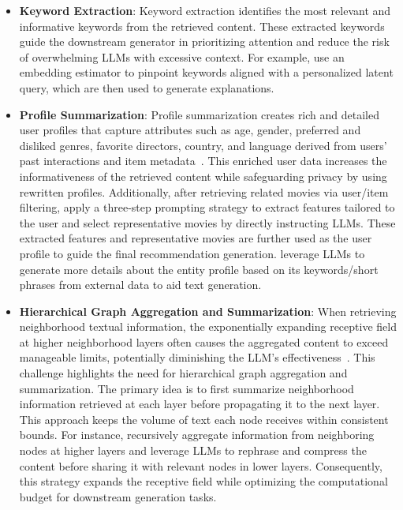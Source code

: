 \begin{itemize}[leftmargin=*]
    \item \textbf{Keyword Extraction}: Keyword extraction identifies the most relevant and informative keywords from the retrieved content. These extracted keywords guide the downstream generator in prioritizing attention and reduce the risk of overwhelming LLMs with excessive context. For example, \citet{xie2023factual} use an embedding estimator to pinpoint keywords aligned with a personalized latent query, which are then used to generate explanations.

    \item \textbf{Profile Summarization}: Profile summarization creates rich and detailed user profiles that capture attributes such as age, gender, preferred and disliked genres, favorite directors, country, and language derived from users' past interactions and item metadata~\cite{wei2024llmrec}. This enriched user data increases the informativeness of the retrieved content while safeguarding privacy by using rewritten profiles. Additionally, after retrieving related movies via user/item filtering, \citet{wang2023zero} apply a three-step prompting strategy to extract features tailored to the user and select representative movies by directly instructing LLMs. These extracted features and representative movies are further used as the user profile to guide the final recommendation generation. \citet{guo2024lightrag} leverage LLMs to generate more details about the entity profile based on its keywords/short phrases from external data to aid text generation.

    \item \textbf{Hierarchical Graph Aggregation and Summarization}: 
    When retrieving neighborhood textual information, the exponentially expanding receptive field at higher neighborhood layers often causes the aggregated content to exceed manageable limits, potentially diminishing the LLM's effectiveness~\cite{li2024long}. This challenge highlights the need for hierarchical graph aggregation and summarization. The primary idea is to first summarize neighborhood information retrieved at each layer before propagating it to the next layer. This approach keeps the volume of text each node receives within consistent bounds. For instance, \citet{du2024large} recursively aggregate information from neighboring nodes at higher layers and leverage LLMs to rephrase and compress the content before sharing it with relevant nodes in lower layers. Consequently, this strategy expands the receptive field while optimizing the computational budget for downstream generation tasks.
\end{itemize}
 
